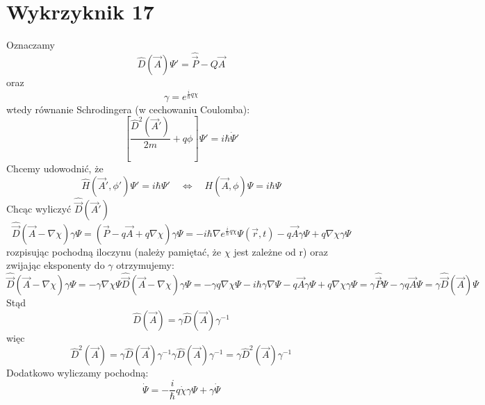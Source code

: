 \documentclass[a4paper,12pt]{article}
\begin{document}
\section{Wykrzyknik 17}
Oznaczamy 
\begin{equation*}
  \hat{D} (\vec{A}) \Psi' = \hat{\vec{P}} - Q \vec{A}
\end{equation*}
oraz
\begin{equation*}
  \gamma = e^{\frac{i}{\hbar}q\chi}
\end{equation*}
wtedy równanie Schrodingera (w cechowaniu Coulomba):
\begin{equation*}
  \left[ \frac{\hat{D}^2(\vec{A}')}{2m} + q\phi \right] \Psi' = i \hbar
  \dot{\Psi}'
\end{equation*}
Chcemy udowodnić, że
\begin{equation*}
  \hat{H}(\vec{A}', \phi') \Psi' = i\hbar \Psi' \quad \Leftrightarrow \quad
  H(\vec{A}, \phi) \Psi = i\hbar \Psi
\end{equation*}
Chcąc wyliczyć $\hat{\vec{D}}(\vec{A}')$ 
\begin{equation*}
  \hat{\vec{D}} (\vec{A} - \nabla \chi) \gamma \Psi = \left( \vec{P} - q\vec{A}
  + q\nabla \chi \right) \gamma \Psi = -i \hbar \nabla
  e^{\frac{i}{\hbar}q\chi} \Psi(\vec{r}, t) - q \vec{A} \gamma\Psi + q\nabla\chi
  \gamma \Psi
\end{equation*}
rozpisując pochodną iloczynu (należy pamiętać, że $\chi$ jest zależne od r)
oraz zwijając eksponenty do $\gamma$ otrzymujemy:
\begin{equation*}
  \hat{\vec{D}} (\vec{A} - \nabla \chi) \gamma \Psi = -\gamma \nabla \chi \Psi
  \hat{\vec{D}} (\vec{A} - \nabla \chi) \gamma \Psi = -\gamma q \nabla \chi \Psi
  - i\hbar \gamma \nabla \Psi - q\vec{A} \gamma \Psi + q\nabla \chi \gamma \Psi
  = \gamma \hat{\vec{P}} \Psi - \gamma q \vec{A} \Psi = \gamma \hat{\vec{D}}
  (\vec{A}) \Psi
\end{equation*}
Stąd 
\begin{equation*}
  \hat{D}(\vec{A}) = \gamma\hat{D} (\vec{A})\gamma^{-1}
\end{equation*}
więc
\begin{equation*}
  \hat{D}^2 (\vec{A}) = \gamma\hat{D}(\vec{A})\gamma^{-1} \gamma
  \hat{D}(\vec{A}) \gamma^{-1} = \gamma \hat{D}^2(\vec{A}) \gamma^{-1}
\end{equation*}
Dodatkowo wyliczamy pochodną:
\begin{equation*}
  \dot{\Psi} = -\frac{i}{\hbar}q \dot{\chi} \gamma\Psi + \gamma\dot{\Psi}
\end{equation*}
\end{document}
